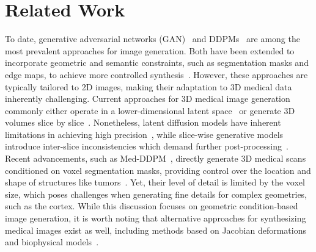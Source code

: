 \section{Related Work}
To date, generative adversarial networks (GAN)~\cite{goodfellow2014gan} and 
DDPMs~\cite{ddpm,sohl-dickstein-diffusion2015} are among the most prevalent approaches for image generation. 
Both have been extended to incorporate geometric and semantic constraints, such as segmentation masks and edge maps, to achieve more controlled  synthesis~\cite{pix2pix2017,Wang2018conditionalGAN,park2019SPADE,Rombach2022diffusion,Zhang2023controlnet}. 
However, these approaches are typically tailored to 2D images, making their adaptation to 3D medical data inherently challenging. 
Current approaches for 3D medical image generation commonly either
operate in a lower-dimensional latent space~\cite{Kim2024controllable,Peng2024metadataconditioned,Pinaya2022latentmri} or generate 3D volumes slice by slice~\cite{Han2023medgen3d,Peng2023generatingbrainmri,Li2024pasta}. Nonetheless, 
latent diffusion models have inherent limitations in achieving high precision~\cite{Konz2024controllableddpm,Rombach2022diffusion}, while slice-wise generative models introduce inter-slice inconsistencies which demand further post-processing~\cite{Han2023medgen3d,Li2024pasta}.
Recent advancements, such as Med-DDPM~\cite{Dorjsembe2024medddpm}, directly generate 3D medical scans conditioned on voxel segmentation masks, providing control over the location and shape of structures like tumors~\cite{Dorjsembe2024medddpm,Kim2024controllable}. 
Yet, their level of detail is limited by the voxel size, 
which poses challenges when generating fine details for complex geometries, such as the cortex.
While this discussion focuses on geometric condition-based image generation, it is worth noting that alternative approaches for synthesizing medical images exist as well, including methods based on Jacobian deformations~\cite{Karacali2006simulation,Sharma2010atrophy} and biophysical models~\cite{Camara2006atrophy,CastellanoSmith2003simulation,Khanal2016biophysical}.

